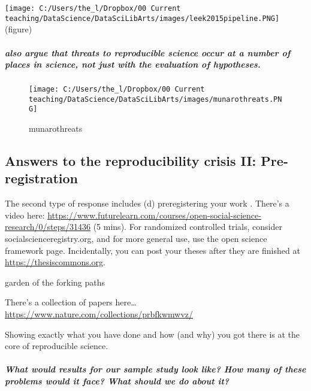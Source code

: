\documentclass[]{book}
\let\oldsubparagraph\subparagraph
\renewcommand{\subparagraph}[1]{\oldsubparagraph{#1}\mbox{}}
\theoremstyle{definition}
\theoremstyle{definition}
\theoremstyle{definition}
\theoremstyle{remark}
\begin{document}
\texttt{[image: C:/Users/the\_l/Dropbox/00 Current teaching/DataScience/DataSciLibArts/images/leek2015pipeline.PNG]}
(figure)

\subparagraph{\texorpdfstring{\citet{munafo2017manifesto} also argue
that threats to reproducible science occur at a number of places in
science, not just with the evaluation of
hypotheses.}{@munafo2017manifesto also argue that threats to reproducible science occur at a number of places in science, not just with the evaluation of hypotheses.}}\label{munafo2017manifesto-also-argue-that-threats-to-reproducible-science-occur-at-a-number-of-places-in-science-not-just-with-the-evaluation-of-hypotheses.}

\begin{figure}
\centering
\texttt{[image: C:/Users/the\_l/Dropbox/00 Current teaching/DataScience/DataSciLibArts/images/munarothreats.PNG]}
\caption{munarothreats}
\end{figure}

\subsection{Answers to the reproducibility crisis II:
Pre-registration}\label{answers-to-the-reproducibility-crisis-ii-pre-registration}

The second type of response includes (d) preregistering your work
\citep{miguel2014promoting}. There's a video here:
\url{https://www.futurelearn.com/courses/open-social-science-research/0/steps/31436}
(5 mins). For randomized controlled trials, consider
socialscienceregistry.org, and for more general use, use the open
science framework page. Incidentally, you can post your theses after
they are finished at \url{https://thesiscommons.org}.

garden of the forking paths

There's a collection of papers here\ldots{}
\url{https://www.nature.com/collections/prbfkwmwvz/}

Showing exactly what you have done and how (and why) you got there is at
the core of reproducible science.

\subparagraph{\texorpdfstring{\emph{What would results for our sample
study look like? How many of these problems would it face? What should
we do about
it?}}{What would results for our sample study look like? How many of these problems would it face? What should we do about it?}}\label{what-would-results-for-our-sample-study-look-like-how-many-of-these-problems-would-it-face-what-should-we-do-about-it}
\end{document}
